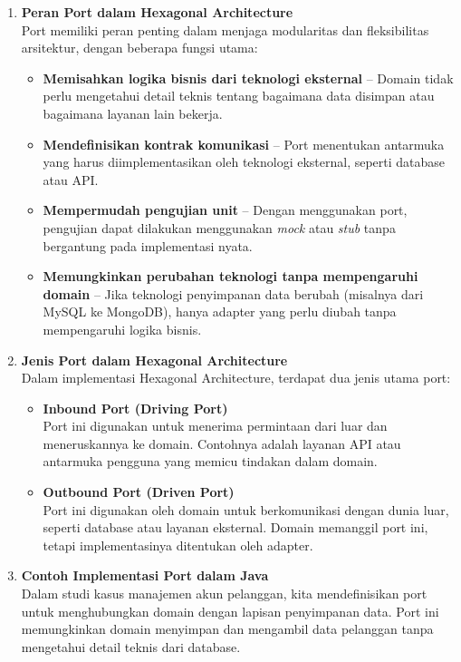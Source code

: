 \begin{enumerate}
	\item \textbf{Peran Port dalam Hexagonal Architecture} \\
	Port memiliki peran penting dalam menjaga modularitas dan fleksibilitas arsitektur, dengan beberapa fungsi utama:
	\begin{itemize}
		\item \textbf{Memisahkan logika bisnis dari teknologi eksternal} – Domain tidak perlu mengetahui detail teknis tentang bagaimana data disimpan atau bagaimana layanan lain bekerja.
		\item \textbf{Mendefinisikan kontrak komunikasi} – Port menentukan antarmuka yang harus diimplementasikan oleh teknologi eksternal, seperti database atau API.
		\item \textbf{Mempermudah pengujian unit} – Dengan menggunakan port, pengujian dapat dilakukan menggunakan \textit{mock} atau \textit{stub} tanpa bergantung pada implementasi nyata.
		\item \textbf{Memungkinkan perubahan teknologi tanpa mempengaruhi domain} – Jika teknologi penyimpanan data berubah (misalnya dari MySQL ke MongoDB), hanya adapter yang perlu diubah tanpa mempengaruhi logika bisnis.
	\end{itemize}
	
	\item \textbf{Jenis Port dalam Hexagonal Architecture} \\
	Dalam implementasi Hexagonal Architecture, terdapat dua jenis utama port:
	
	\begin{itemize}
		\item \textbf{Inbound Port (Driving Port)} \\
		Port ini digunakan untuk menerima permintaan dari luar dan meneruskannya ke domain. Contohnya adalah layanan API atau antarmuka pengguna yang memicu tindakan dalam domain.
		
		\item \textbf{Outbound Port (Driven Port)} \\
		Port ini digunakan oleh domain untuk berkomunikasi dengan dunia luar, seperti database atau layanan eksternal. Domain memanggil port ini, tetapi implementasinya ditentukan oleh adapter.
	\end{itemize}
	
	\item \textbf{Contoh Implementasi Port dalam Java} \\
	Dalam studi kasus manajemen akun pelanggan, kita mendefinisikan port untuk menghubungkan domain dengan lapisan penyimpanan data. Port ini memungkinkan domain menyimpan dan mengambil data pelanggan tanpa mengetahui detail teknis dari database.
	

\end{enumerate}
